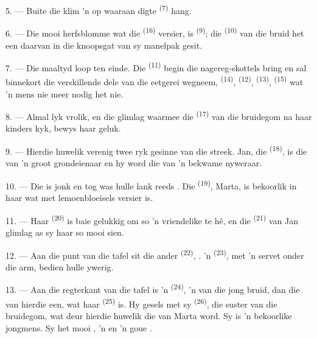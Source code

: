 5. --- Buite die  klim 'n  op waaraan digte
 \textsuperscript{(7)} hang.

6. --- Die mooi herfsblomme wat die  \textsuperscript{(16)} versier, is
 \textsuperscript{(9)}; die  \textsuperscript{(10)} van
die bruid het een daarvan in die knoopsgat van sy manelpak gesit.

7. --- Die maaltyd loop ten einde. Die  \textsuperscript{(11)} begin
die nagereg-skottels bring en sal binnekort die verskillende dele van die eetgerei
wegneem,  \textsuperscript{(14)},  \textsuperscript{(12)},
 \textsuperscript{(13)},  \textsuperscript{(15)} wat 'n
mens nie meer nodig het nie.

\VUsaut{3.0mm}

8. --- Almal lyk vrolik, en die glimlag waarmee die 
\textsuperscript{(17)} van die bruidegom na haar kinders kyk, bewys haar geluk.

9. --- Hierdie huwelik verenig twee ryk gesinne van die streek. Jan, die
 \textsuperscript{(18)}, is die  van 'n groot grondeienaar
en hy word die  van 'n bekwame nyweraar.

10. --- Die  is jonk en tog was hulle lank reeds . Die
 \textsuperscript{(19)}, Marta, is bekoorlik in haar 
wat met lemoenbloeisels versier is.

11. --- Haar  \textsuperscript{(20)} is baie gelukkig om so 'n
vriendelike  te hê, en die 
\textsuperscript{(21)} van Jan glimlag as sy haar  so mooi sien.

12. --- Aan die punt van die tafel sit die ander 
\textsuperscript{(22)}, . 'n
 \textsuperscript{(23)}, met 'n servet onder die arm, bedien hulle
ywerig.

\VUsaut{3.0mm}

13. --- Aan die regterkant van die tafel is 'n 
\textsuperscript{(24)}, 'n  van die jong bruid, dan die
 van hierdie een, wat haar  \textsuperscript{(25)}
is. Hy gesels met sy  \textsuperscript{(26)}, die suster van die
bruidegom, wat deur hierdie huwelik die  van Marta word. Sy is 'n
bekoorlike jongmens. Sy het mooi , 'n  en 'n
goue .

